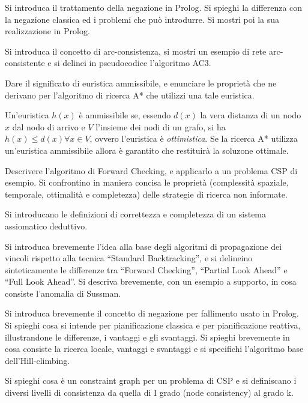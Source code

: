 \documentclass[answers, a4paper, 11pt]{exam}
\begin{document}
\begin{questions}
\question Si introduca il trattamento della negazione in Prolog. Si spieghi la differenza con la negazione
classica ed i problemi che può introdurre. Si mostri poi la sua realizzazione in Prolog.

\question Si introduca il concetto di arc-consistenza, si mostri un esempio di rete arc-consistente
e si delinei in pseudocodice l'algoritmo AC3.

\question Dare il significato di euristica ammissibile, e enunciare le proprietà che ne derivano per l’algoritmo
di ricerca A* che utilizzi una tale euristica.
	\begin{solution}
		Un'euristica $h(x)$ è ammissibile se, essendo $d(x)$ la vera distanza di un nodo $x$ dal nodo di arrivo e $V$ l'insieme dei nodi di un grafo, si ha $h(x) \leq d(x) \forall x \in V$, ovvero l'euristica è \emph{ottimistica}. 
		Se la ricerca A* utilizza un'euristica ammissibile allora è garantito che restituirà la soluzone ottimale. 
	\end{solution}
\question Descrivere l’algoritmo di Forward Checking, e applicarlo a un problema CSP di esempio.
\question Si confrontino in maniera concisa le proprietà (complessità spaziale, temporale, ottimalità e
completezza) delle strategie di ricerca non informate.

\question Si introducano le definizioni di correttezza e completezza di un sistema assiomatico deduttivo.

\question Si introduca brevemente l’idea alla base degli algoritmi di propagazione dei vincoli rispetto alla
tecnica “Standard Backtracking”, e si delineino sinteticamente le differenze tra “Forward Checking”,
“Partial Look Ahead” e “Full Look Ahead”.
\question Si descriva brevemente, con un esempio a supporto, in cosa consiste l’anomalia di Sussman.

\question Si introduca brevemente il concetto di negazione per fallimento usato in Prolog.
\question Si spieghi cosa si intende per pianificazione classica e per pianificazione reattiva, illustrandone le
differenze, i vantaggi e gli svantaggi.
\question Si spieghi brevemente in cosa consiste la ricerca locale, vantaggi e svantaggi e si specifichi
l’algoritmo base dell’Hill-climbing.

\question Si spieghi cosa è un constraint graph per un problema di CSP e si definiscano i diversi livelli di
consistenza da quella di I grado (node consistency) al grado k.


\end{questions}
\end{document}

